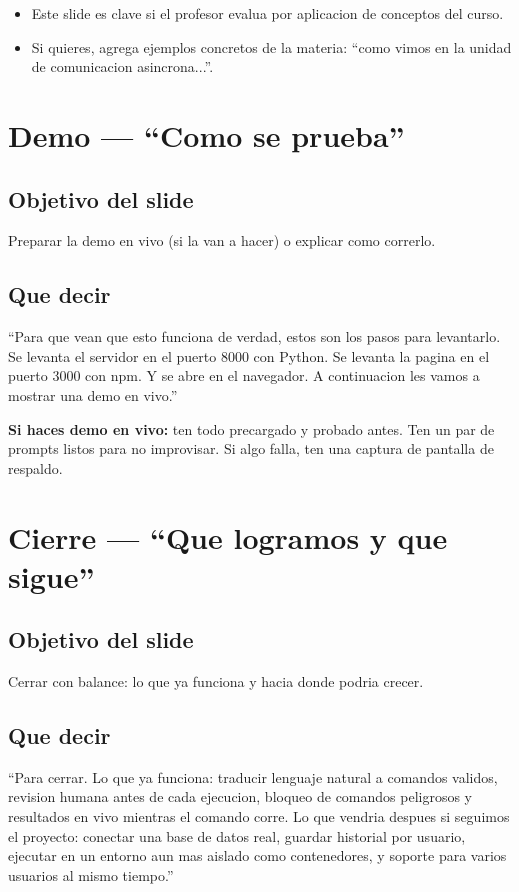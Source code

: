 \documentclass[12pt,a4paper]{article}
\begin{document}
\begin{itemize}
  \item Este slide es clave si el profesor evalua por aplicacion de conceptos del curso.
  \item Si quieres, agrega ejemplos concretos de la materia: ``como vimos en la unidad de comunicacion asincrona...''.
\end{itemize}

\section{Demo --- ``Como se prueba''}
\subsection{Objetivo del slide}
Preparar la demo en vivo (si la van a hacer) o explicar como correrlo.

\subsection{Que decir}
\begin{frasebox}
``Para que vean que esto funciona de verdad, estos son los pasos para levantarlo. Se levanta el servidor en el puerto 8000 con Python. Se levanta la pagina en el puerto 3000 con npm. Y se abre en el navegador. A continuacion les vamos a mostrar una demo en vivo.''
\end{frasebox}

\begin{tipbox}
\textbf{Si haces demo en vivo:} ten todo precargado y probado antes. Ten un par de prompts listos para no improvisar. Si algo falla, ten una captura de pantalla de respaldo.
\end{tipbox}

\section{Cierre --- ``Que logramos y que sigue''}
\subsection{Objetivo del slide}
Cerrar con balance: lo que ya funciona y hacia donde podria crecer.

\subsection{Que decir}
\begin{frasebox}
``Para cerrar. Lo que ya funciona: traducir lenguaje natural a comandos validos, revision humana antes de cada ejecucion, bloqueo de comandos peligrosos y resultados en vivo mientras el comando corre. Lo que vendria despues si seguimos el proyecto: conectar una base de datos real, guardar historial por usuario, ejecutar en un entorno aun mas aislado como contenedores, y soporte para varios usuarios al mismo tiempo.''
\end{frasebox}
\end{document}
